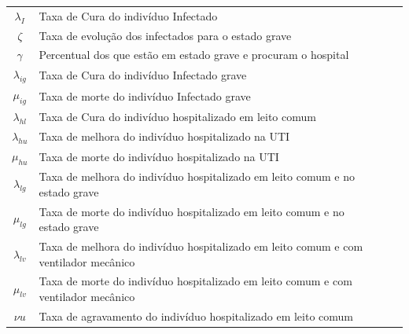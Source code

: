 \documentclass{article}
\begin{document}
\begin{table}[h]
\begin{tabular}{|c|p{7cm}|p{2cm}|l|l}
		$\lambda_I$    & Taxa de Cura do indivíduo Infectado                                                   &                           &             &   \\ \cline{1-4}
		$\zeta$        & Taxa de evolução dos infectados para o estado grave                                  &                           &             &   \\ \cline{1-4}
		$\gamma$       & Percentual dos que estão em estado grave e procuram o hospital                        &                           &             &   \\ \cline{1-4}
		$\lambda_{ig}$ & Taxa de Cura do indivíduo Infectado grave                                             &                           &             &   \\ \cline{1-4}
		$\mu_{ig}$     & Taxa de morte do indivíduo Infectado grave                                            &                           &             &   \\ \cline{1-4}
		$\lambda_{hl}$ & Taxa de Cura do indivíduo hospitalizado em leito comum                                &                           &             &   \\ \cline{1-4}
		$\lambda_{hu}$ & Taxa de melhora do indivíduo hospitalizado  na UTI                                    &                           &             &   \\ \cline{1-4}
		$\mu_{hu}$     & Taxa de morte do indivíduo hospitalizado  na UTI                                      &                           &             &   \\ \cline{1-4}
		$\lambda_{lg}$ & Taxa de melhora do indivíduo hospitalizado  em leito comum e no estado grave          &                           &             &   \\ \cline{1-4}
		$\mu_{lg}$     & Taxa de morte do indivíduo hospitalizado  em leito comum e no estado grave            &                           &             &   \\ \cline{1-4}
		$\lambda_{lv}$ & Taxa de melhora do indivíduo hospitalizado  em leito comum e com ventilador mecânico &                           &             &   \\ \cline{1-4}
		$\mu_{lv}$     & Taxa de morte do indivíduo hospitalizado  em leito comum e com ventilador mecânico   &                           &             &   \\ \cline{1-4}
		$\nu{u}$       & Taxa de agravamento do indivíduo hospitalizado em leito comum                         &                           &             &   \\ \cline{1-4}

\end{tabular}
\end{table}
\end{document}
